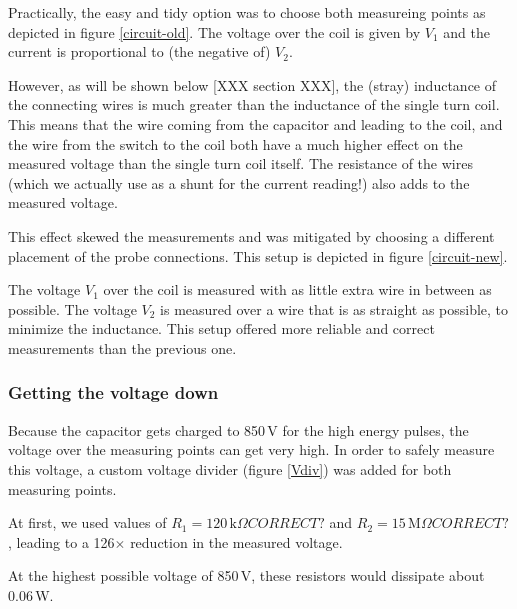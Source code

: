 Practically, the easy and tidy option was to choose both measureing points 
as depicted in figure \ref{circuit-old}. The voltage over the coil is given 
by $V_1$ and the current is proportional to (the negative of) $V_2$.


However, as will be shown below [XXX section XXX], the (stray) inductance 
of the connecting wires is much greater than the inductance of the single 
turn coil. This means that the wire coming from the capacitor and leading 
to the coil, and the wire from the switch to the coil both have a much 
higher effect on the measured voltage than the single turn coil itself.  
The resistance of the wires (which we actually use as a shunt for the 
current reading!) also adds to the measured voltage.

This effect skewed the measurements and was mitigated by choosing a 
different placement of the probe connections. This setup is depicted in 
figure \ref{circuit-new}.


The voltage $V_1$ over the coil is measured with as little extra wire in 
between as possible. The voltage $V_2$ is measured over a wire that is as 
straight as possible, to minimize the inductance. This setup offered more 
reliable and correct measurements than the previous one.

\subsubsection{Getting the voltage down}
Because the capacitor gets charged to 850\,V for the high energy pulses, 
the voltage over the measuring points can get very high. In order to safely 
measure this voltage, a custom voltage divider (figure \ref{Vdiv}) was 
added for both measuring points.


At first, we used values of $R_1 = 120\,\mathrm{k}\Omega CORRECT?$ and
$R_2 = 15\,\mathrm{M}\Omega CORRECT?$, leading to a 126$\times$ reduction 
in the measured voltage.

At the highest possible voltage of 850\,V, these resistors would dissipate 
about 0.06\,W.








